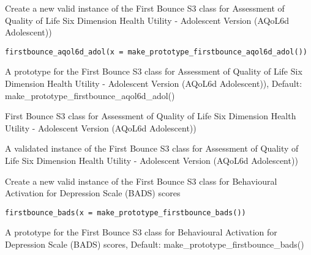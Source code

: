\documentclass[a4paper]{book}
\begin{document}
%
\begin{Description}\relax
Create a new valid instance of the First Bounce S3 class for Assessment of Quality of Life Six Dimension Health Utility - Adolescent Version (AQoL6d Adolescent))
\end{Description}
%
\begin{Usage}
\begin{verbatim}
firstbounce_aqol6d_adol(x = make_prototype_firstbounce_aqol6d_adol())
\end{verbatim}
\end{Usage}
%
\begin{Arguments}
\begin{ldescription}
\item[\code{x}] A prototype for the First Bounce S3 class for Assessment of Quality of Life Six Dimension Health Utility - Adolescent Version (AQoL6d Adolescent)), Default: make\_prototype\_firstbounce\_aqol6d\_adol()
\end{ldescription}
\end{Arguments}
%
\begin{Details}\relax
First Bounce S3 class for Assessment of Quality of Life Six Dimension Health Utility - Adolescent Version (AQoL6d Adolescent))
\end{Details}
%
\begin{Value}
A validated instance of the First Bounce S3 class for Assessment of Quality of Life Six Dimension Health Utility - Adolescent Version (AQoL6d Adolescent))
\end{Value}
%
\begin{Description}\relax
Create a new valid instance of the First Bounce S3 class for Behavioural Activation for Depression Scale (BADS) scores
\end{Description}
%
\begin{Usage}
\begin{verbatim}
firstbounce_bads(x = make_prototype_firstbounce_bads())
\end{verbatim}
\end{Usage}
%
\begin{Arguments}
\begin{ldescription}
\item[\code{x}] A prototype for the First Bounce S3 class for Behavioural Activation for Depression Scale (BADS) scores, Default: make\_prototype\_firstbounce\_bads()
\end{ldescription}
\end{Arguments}
\end{document}
